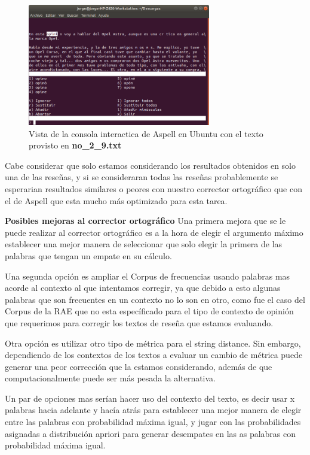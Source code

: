 \documentclass[paper=letter, fontsize=11pt]{scrartcl}
\numberwithin{equation}{section} %
\numberwithin{figure}{section} %
\numberwithin{table}{section} %
\begin{document}
\begin{figure}[h]
\centering
\includegraphics[width=8cm]{aspell.png}
\caption{Vista de la consola interactica de Aspell en Ubuntu con el texto provisto en \textbf{no\_2\_9.txt}}
\end{figure}

Cabe considerar que solo estamos considerando los resultados obtenidos en solo una de las rese\~nas, y si se consideraran todas las rese\~nas probablemente se esperarian resultados similares o peores con nuestro corrector ortogr\'afico que con el de Aspell que esta mucho m\'as optimizado para esta tarea.\newline

\textbf{Posibles mejoras al corrector ortogr\'afico}\newline
Una primera mejora que se le puede realizar al corrector ortogr\'afico es a la hora de elegir el argumento m\'aximo establecer una mejor manera de seleccionar que solo elegir la primera de las palabras que tengan un empate en su c\'alculo.\newline

Una segunda opci\'on es ampliar el Corpus de frecuencias usando palabras mas acorde al contexto al que intentamos corregir, ya que debido a esto algunas palabras que son frecuentes en un contexto no lo son en otro, como fue el caso del Corpus de la RAE que no esta espec\'ificado para el tipo de contexto de opini\'on que requerimos para corregir los textos de rese\~na que estamos evaluando.\newline

Otra opci\'on es utilizar otro tipo de m\'etrica para el string distance. Sin embargo, dependiendo de los contextos de los textos a evaluar un cambio de m\'etrica puede generar una peor correcci\'on que la estamos considerando, adem\'as de que computacionalmente puede ser m\'as pesada la alternativa.\newline

Un par de opciones mas ser\'ian hacer uso del contexto del texto, es decir usar x palabras hacia adelante y hac\'ia atr\'as para establecer una mejor manera de elegir entre las palabras con probabilidad m\'axima igual, y jugar con las probabilidades asignadas a distribuci\'on apriori para generar desempates en las as palabras con probabilidad m\'axima igual.
\end{document}
